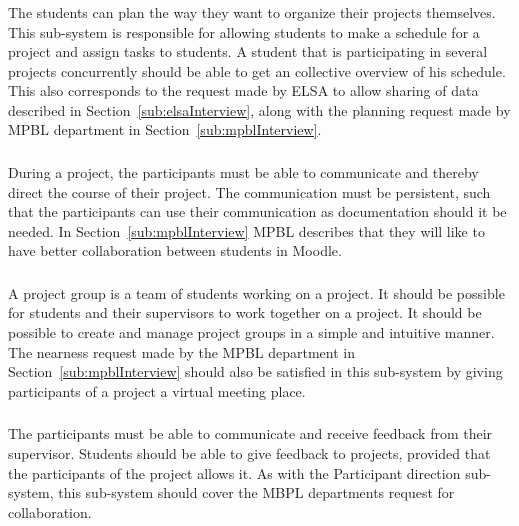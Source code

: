 \subsubsection{\timelinegroup{}} %
The students can plan the way they want to organize their projects themselves.
This sub-system is responsible for allowing students to make a schedule for a project and assign tasks to students.
A student that is participating in several projects concurrently should be able to get an collective overview of his schedule.
This also corresponds to the request made by ELSA to allow sharing of data described in Section~\ref{sub:elsaInterview}, along with the planning request made by MPBL department in Section~\ref{sub:mpblInterview}.

\subsubsection{\blackboardgroup{}} %
During a project, the participants must be able to communicate and thereby direct the course of their project.
The communication must be persistent, such that the participants can use their communication as documentation should it be needed.
In Section~\ref{sub:mpblInterview} MPBL describes that they will like to have better collaboration between students in Moodle.

\subsubsection{\administrationgroup{}} %
\label{sec:admgroupdecom}
A project group is a team of students working on a project.
It should be possible for students and their supervisors to work together on a project.%
It should be possible to create and manage project groups in a simple and intuitive manner.
The nearness request made by the MPBL department in Section~\ref{sub:mpblInterview} should also be satisfied in this sub-system by giving participants of a project a virtual meeting place.

\subsubsection{\supervisorgroup{}} %
The participants must be able to communicate and receive feedback from their supervisor.
Students should be able to give feedback to projects, provided that the participants of the project allows it.
As with the Participant direction sub-system, this sub-system should cover the MBPL departments request for collaboration.


